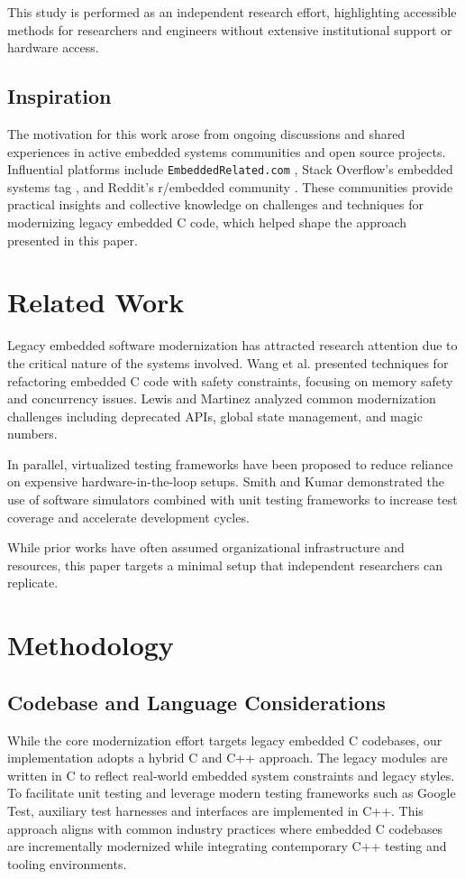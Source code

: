 \documentclass[conference]{IEEEtran}
\begin{document}
	This study is performed as an independent research effort, highlighting accessible methods for researchers and engineers without extensive institutional support or hardware access.
	
	\subsection*{Inspiration}
	The motivation for this work arose from ongoing discussions and shared experiences in active embedded systems communities and open source projects. Influential platforms include \texttt{EmbeddedRelated.com} \cite{embeddedrelated}, Stack Overflow's embedded systems tag \cite{stackoverflow}, and Reddit's r/embedded community \cite{redditembedded}. These communities provide practical insights and collective knowledge on challenges and techniques for modernizing legacy embedded C code, which helped shape the approach presented in this paper.
	
	\section{Related Work}
	\label{sec:related}
	Legacy embedded software modernization has attracted research attention due to the critical nature of the systems involved. Wang et al. \cite{wang2021safe} presented techniques for refactoring embedded C code with safety constraints, focusing on memory safety and concurrency issues. Lewis and Martinez \cite{lewis2019modernizing} analyzed common modernization challenges including deprecated APIs, global state management, and magic numbers.
	
	In parallel, virtualized testing frameworks have been proposed to reduce reliance on expensive hardware-in-the-loop setups. Smith and Kumar \cite{smith2020virtualized} demonstrated the use of software simulators combined with unit testing frameworks to increase test coverage and accelerate development cycles.
	
	While prior works have often assumed organizational infrastructure and resources, this paper targets a minimal setup that independent researchers can replicate.
	
	\section{Methodology}
	\label{sec:methodology}
	
	\subsection{Codebase and Language Considerations}
	While the core modernization effort targets legacy embedded C codebases, our implementation adopts a hybrid C and C++ approach. The legacy modules are written in C to reflect real-world embedded system constraints and legacy styles. To facilitate unit testing and leverage modern testing frameworks such as Google Test, auxiliary test harnesses and interfaces are implemented in C++. This approach aligns with common industry practices where embedded C codebases are incrementally modernized while integrating contemporary C++ testing and tooling environments.
	
\end{document}
